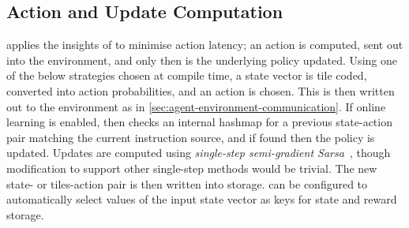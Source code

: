 %

\subsection{Action and Update Computation}\label{sec:action-and-update-computation}
\approachshort{} applies the insights of \textcite{DBLP:journals/firai/TravnikMSP18} to minimise action latency; an action is computed, sent out into the environment, and only then is the underlying policy updated.
Using one of the below strategies chosen at compile time, a state vector is tile coded, converted into action probabilities, and an action is chosen.
This is then written out to the environment as in \cref{sec:agent-environment-communication}.
If online learning is enabled, \approachshort{} then checks an internal hashmap for a previous state-action pair matching the current instruction source, and if found then the policy is updated.
Updates are computed using \emph{single-step semi-gradient Sarsa}~\cite[pp. \numrange{217}{221}]{RL2E}, though modification to support other single-step methods would be trivial.
The new state- or tiles-action pair is then written into storage.
\approachshort{} can be configured to automatically select values of the input state vector as keys for state and reward storage.

